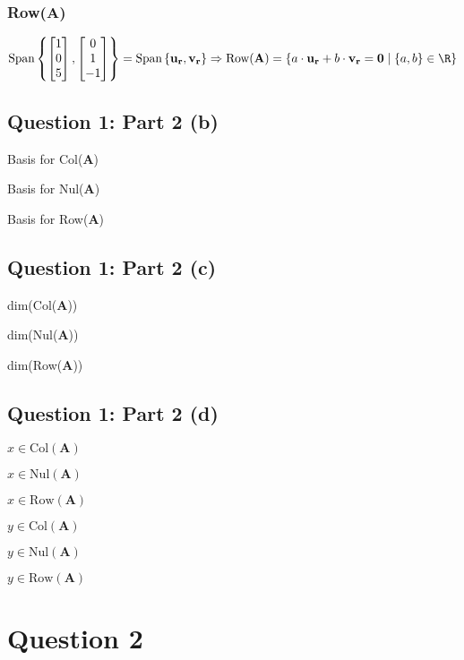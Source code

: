 \documentclass{article}
\begin{document}
\subsubsection{Row(\textbf{A})} 

\[%
    \text{Span} \left\{
    \begin{bmatrix} 1\\0\\5\\   \end{bmatrix},
    \begin{bmatrix} 0\\1\\-1\\  \end{bmatrix}
    \right\}
    =
    \text{Span} \left\{ 
    \mathbf{u_{r}},
    \mathbf{v_{r}}
    \right\}
    \Rightarrow 
    \text{Row}(\mathbf{A})=
    \left\{
    a \cdot \mathbf{u_{r}} +
    b \cdot \mathbf{v_{r}} 
    =
    \mathbf{0}
    \mid   
    \left\{ a,b \right\} \in \R
    \right\}
\]%


\subsection{Question 1: Part 2 (b)} 
Basis for Col($ \mathbf{A} $)

Basis for Nul($ \mathbf{A} $)

Basis for Row($ \mathbf{A} $)
\subsection{Question 1: Part 2 (c)} 
dim(Col($ \mathbf{A} $))

dim(Nul($ \mathbf{A} $))

dim(Row($ \mathbf{A} $))

\subsection{Question 1: Part 2 (d)} 
$ x \in \text{Col}(\mathbf{A}) $

$ x \in \text{Nul}(\mathbf{A}) $

$ x \in \text{Row}(\mathbf{A}) $

\vspace{2mm}

$ y \in \text{Col}(\mathbf{A}) $

$ y \in \text{Nul}(\mathbf{A}) $

$ y \in \text{Row}(\mathbf{A}) $

\section{Question 2} 
\end{document}
